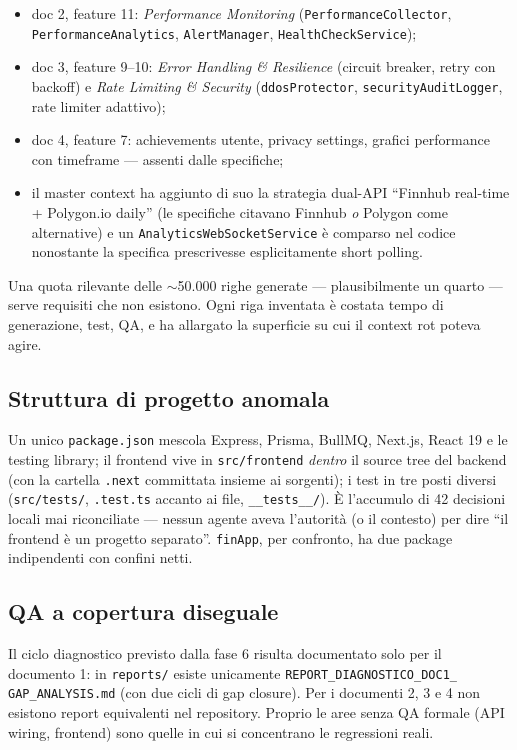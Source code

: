 \documentclass[11pt,a4paper]{article}
\newcommand{\file}[1]{\texttt{\small #1}}
\begin{document}
\begin{itemize}[leftmargin=1.5em]
  \item doc 2, feature 11: \emph{Performance Monitoring} (\file{PerformanceCollector}, \file{PerformanceAnalytics}, \file{AlertManager}, \file{HealthCheckService});
  \item doc 3, feature 9--10: \emph{Error Handling \& Resilience} (circuit breaker, retry con backoff) e \emph{Rate Limiting \& Security} (\file{ddosProtector}, \file{securityAuditLogger}, rate limiter adattivo);
  \item doc 4, feature 7: achievements utente, privacy settings, grafici performance con timeframe --- assenti dalle specifiche;
  \item il master context ha aggiunto di suo la strategia dual-API ``Finnhub real-time + Polygon.io daily'' (le specifiche citavano Finnhub \emph{o} Polygon come alternative) e un \file{AnalyticsWebSocketService} \`e comparso nel codice nonostante la specifica prescrivesse esplicitamente short polling.
\end{itemize}

Una quota rilevante delle $\sim$50.000 righe generate --- plausibilmente un quarto --- serve requisiti che non esistono. Ogni riga inventata \`e costata tempo di generazione, test, QA, e ha allargato la superficie su cui il context rot poteva agire.

\subsection{Struttura di progetto anomala}

Un unico \file{package.json} mescola Express, Prisma, BullMQ, Next.js, React 19 e le testing library; il frontend vive in \file{src/frontend} \emph{dentro} il source tree del backend (con la cartella \file{.next} committata insieme ai sorgenti); i test in tre posti diversi (\file{src/tests/}, \file{*.test.ts} accanto ai file, \file{\_\_tests\_\_/}). \`E l'accumulo di 42 decisioni locali mai riconciliate --- nessun agente aveva l'autorit\`a (o il contesto) per dire ``il frontend \`e un progetto separato''. \file{finApp}, per confronto, ha due package indipendenti con confini netti.

\subsection{QA a copertura diseguale}

Il ciclo diagnostico previsto dalla fase 6 risulta documentato solo per il documento 1: in \file{reports/} esiste unicamente \file{REPORT\_DIAGNOSTICO\_DOC1\_} \file{GAP\_ANALYSIS.md} (con due cicli di gap closure). Per i documenti 2, 3 e 4 non esistono report equivalenti nel repository. Proprio le aree senza QA formale (API wiring, frontend) sono quelle in cui si concentrano le regressioni reali.
\end{document}
